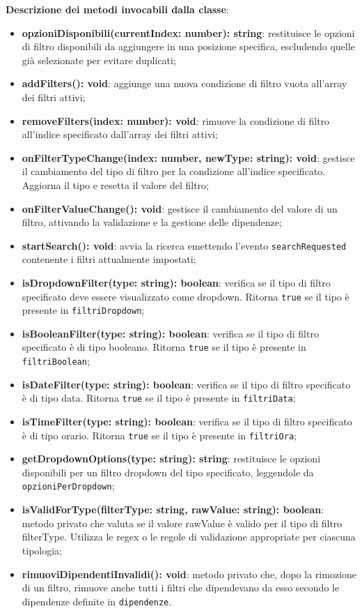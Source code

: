 \documentclass[a4paper,12pt]{article}
\begin{document}
{{{{                \noindent \textbf{Descrizione dei metodi invocabili dalla classe}:
                \begin{itemize}
                    \item \textbf{opzioniDisponibili(currentIndex: number): string}: restituisce le opzioni di filtro disponibili da aggiungere in una posizione specifica, escludendo quelle già selezionate per evitare duplicati;
                    \item \textbf{addFilters(): void}: aggiunge una nuova condizione di filtro vuota all'array dei filtri attivi;
                    \item \textbf{removeFilters(index: number): void}: rimuove la condizione di filtro all'indice specificato dall'array dei filtri attivi;
                    \item \textbf{onFilterTypeChange(index: number, newType: string): void}: gestisce il cambiamento del tipo di filtro per la condizione all'indice specificato. Aggiorna il tipo e resetta il valore del filtro;
                    \item \textbf{onFilterValueChange(): void}: gestisce il cambiamento del valore di un filtro, attivando la validazione e la gestione delle dipendenze;
                    \item \textbf{startSearch(): void}: avvia la ricerca emettendo l'evento \texttt{searchRequested} contenente i filtri attualmente impostati;
                    \item \textbf{isDropdownFilter(type: string): boolean}: verifica se il tipo di filtro specificato deve essere visualizzato come dropdown. Ritorna \texttt{true} se il tipo è presente in \texttt{filtriDropdown};
                    \item \textbf{isBooleanFilter(type: string): boolean}: verifica se il tipo di filtro specificato è di tipo booleano. Ritorna \texttt{true} se il tipo è presente in \texttt{filtriBoolean};
                    \item \textbf{isDateFilter(type: string): boolean}: verifica se il tipo di filtro specificato è di tipo data. Ritorna \texttt{true} se il tipo è presente in \texttt{filtriData};
                    \item \textbf{isTimeFilter(type: string): boolean}: verifica se il tipo di filtro specificato è di tipo orario. Ritorna \texttt{true} se il tipo è presente in \texttt{filtriOra};
                    \item \textbf{getDropdownOptions(type: string): string}: restituisce le opzioni disponibili per un filtro dropdown del tipo specificato, leggendole da \texttt{opzioniPerDropdown};
                    \item \textbf{isValidForType(filterType: string, rawValue: string): boolean}: metodo privato che valuta se il valore rawValue è valido per il tipo di filtro filterType. Utilizza le regex o le regole di validazione appropriate per ciascuna tipologia;
                    \item \textbf{rimuoviDipendentiInvalidi(): void}: metodo privato che, dopo la rimozione di un filtro, rimuove anche tutti i filtri che dipendevano da esso secondo le dipendenze definite in \texttt{dipendenze}.
                \end{itemize}
}}}}
\end{document}
